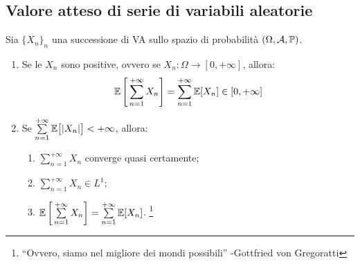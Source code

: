 \subsection{Valore atteso di serie di variabili aleatorie}
\begin{teob}[\JPTh{9.2}]\label{teo-leibniz-style}
  Sia $\{X_n\}_n$ una successione di VA sullo spazio di probabilità $(\Omega, \mathcal A, \mathbb P)$.
  \begin{enumerate}
    \item Se le $X_n$ sono positive, ovvero se $X_n: \Omega \to [0, +\infty]$, allora:
    $$
      \mathbb E\left[\,\sum_{n=1}^{+\infty}X_n \right] = \sum_{n=1}^{+\infty}\mathbb E[X_n] \in [0, +\infty]
    $$
    \item Se $\sum\limits_{n=1}^{+\infty} \mathbb E\big[\lvert X_n\rvert\big] < +\infty$, allora:
    \begin{enumerate}[label=(\roman*)]
      \item $\sum\limits_{n=1}^{+\infty}X_n$ converge quasi certamente;
      \item $\sum\limits_{n=1}^{+\infty} X_n \in L^1$;
      \item $\mathbb E\left[\,\sum\limits_{n=1}^{+\infty} X_n\right] = \sum\limits_{n=1}^{+\infty} \mathbb E[X_n]$.
      \footnote{``Ovvero, siamo nel migliore dei mondi possibili'' -Gottfried von Gregoratti}
    \end{enumerate}
  \end{enumerate}
\end{teob}

